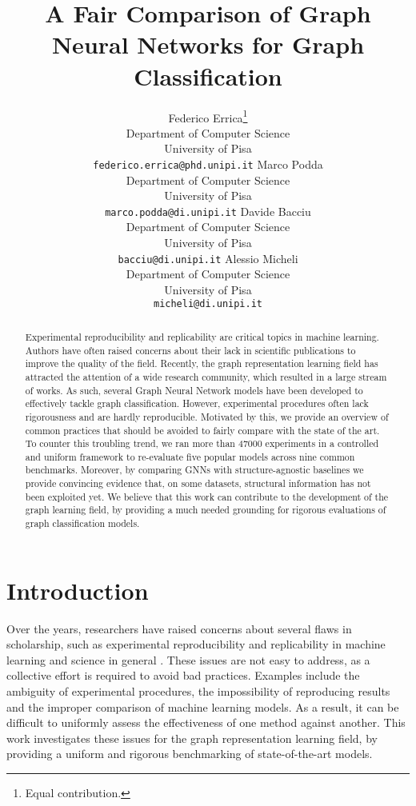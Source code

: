 \documentclass{article}
\title{A Fair Comparison of Graph Neural Networks for Graph Classification}
\author{Federico Errica{\hypersetup{hidelinks}\thanks{Equal contribution.}} \\
Department of Computer Science \\
University of Pisa \\
\texttt{federico.errica@phd.unipi.it}
\And
Marco Podda \\
Department of Computer Science \\
University of Pisa \\
\texttt{marco.podda@di.unipi.it}
\And
Davide Bacciu \\
Department of Computer Science \\
University of Pisa \\
\texttt{bacciu@di.unipi.it}
\And
Alessio Micheli \\
Department of Computer Science \\
University of Pisa \\
\texttt{micheli@di.unipi.it} \\
}
\begin{document}
\maketitle

\begin{abstract}
Experimental reproducibility and replicability are critical topics in machine learning. Authors have often raised concerns about their lack in scientific publications to improve the quality of the field. Recently, the graph representation learning field has attracted the attention of a wide research community, which resulted in a large stream of works.
As such, several Graph Neural Network models have been developed to effectively tackle graph classification. However, experimental procedures often lack rigorousness and are hardly reproducible. Motivated by this, we provide an overview of common practices that should be avoided to fairly compare with the state of the art. To counter this troubling trend, we ran more than 47000 experiments in a controlled and uniform framework to re-evaluate five popular models across nine common benchmarks. Moreover, by comparing GNNs with structure-agnostic baselines we provide convincing evidence that, on some datasets, structural information has not been exploited yet. We believe that this work can contribute to the development of the graph learning field, by providing a much needed grounding for rigorous evaluations of graph classification models.
\end{abstract}

\section{Introduction}\label{sec:introduction}


Over the years, researchers have raised concerns about several flaws in scholarship, such as experimental reproducibility and replicability in machine learning \citep{ai-meets-stupidity, troubling-trends-ml} and science in general \citep{nsa-report-reproducibility}. These issues are not easy to address, as a collective effort is required to avoid bad practices. Examples include the ambiguity of experimental procedures, the impossibility of reproducing results and the improper comparison of machine learning models. As a result, it can be difficult to uniformly assess the effectiveness of one method against another. This work investigates these issues for the graph representation learning field, by providing a uniform and rigorous benchmarking of state-of-the-art models.
\end{document}
